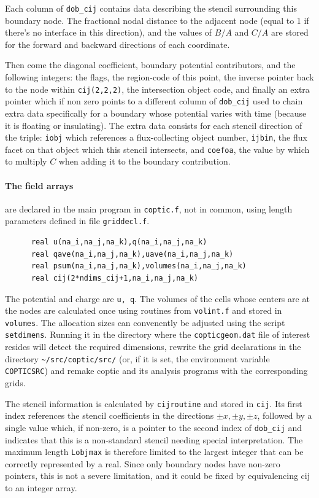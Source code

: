 \documentclass[12pt]{article}
\begin{document}
Each column of \verb!dob_cij! contains data describing the stencil
surrounding this boundary node. The fractional nodal distance to the
adjacent node (equal to 1 if there's no interface in this direction), and the
values of $B/A$ and $C/A$ are stored for the forward and backward
directions of each coordinate. 

Then come the diagonal coefficient, boundary potential contributors,
and the following integers: the flags, the region-code of this point,
the inverse pointer back to the node within \verb!cij(2,2,2)!, the
intersection object code, and finally an extra pointer which if non
zero points to a different column of \verb!dob_cij! used to chain
extra data specifically for a boundary whose potential varies with
time (because it is floating or insulating). The extra data consists
for each stencil direction of the triple: \verb!iobj! which references a
flux-collecting object number, \verb!ijbin!, the flux facet on that
object which this stencil intersects, and \verb!coefoa!, the value by
which to multiply $C$ when adding it to the boundary contribution.


\paragraph{The field arrays} are declared in the main program in \verb!coptic.f!,
not in common, using length parameters defined in file \verb!griddecl.f!.
\begin{verbatim}
      real u(na_i,na_j,na_k),q(na_i,na_j,na_k)
      real qave(na_i,na_j,na_k),uave(na_i,na_j,na_k)
      real psum(na_i,na_j,na_k),volumes(na_i,na_j,na_k)
      real cij(2*ndims_cij+1,na_i,na_j,na_k)
\end{verbatim}
The potential and charge are \verb!u, q!. The volumes of the cells
whose centers are at the nodes are calculated once using routines from
\verb!volint.f! and stored in \verb!volumes!. The allocation sizes can
convenently be adjusted using the script \verb!setdimens!. Running
it in the directory where the \verb!copticgeom.dat! file of interest
resides will detect the required dimensions, rewrite the grid
declarations in the directory \verb!~/src/coptic/src/! (or, if it is
set, the environment variable \verb!COPTICSRC!) and remake
coptic and its analysis programs with the corresponding grids. 

The stencil information is calculated by \verb!cijroutine! and stored
in \verb!cij!. Its first index references the stencil coefficients in
the directions $\pm x, \pm y, \pm z$, followed by a single value
which, if non-zero, is a pointer to the second index of \verb!dob_cij!
and indicates that this is a non-standard stencil needing special
interpretation. The maximum length \verb!Lobjmax! is therefore limited
to the largest integer that can be correctly represented by a
real. Since only boundary nodes have non-zero pointers, this is not a
severe limitation, and it could be fixed by equivalencing cij to an
integer array.
\end{document}
